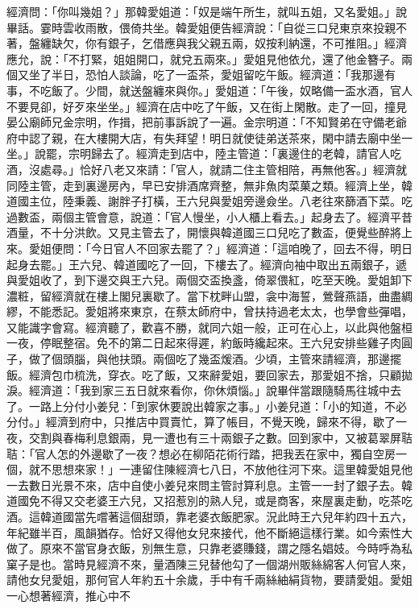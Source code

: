 經濟問：「你叫幾姐？」那韓愛姐道：「奴是端午所生，就叫五姐，又名愛姐。」說畢話。霎時雲收雨散，偎倚共坐。韓愛姐便告經濟說：「自從三口兒東京來投親不著，盤纏缺欠，你有銀子，乞借應與我父親五兩，奴按利納還，不可推阻。」經濟應允，說：「不打緊，姐姐開口，就兌五兩來。」愛姐見他依允，還了他金簪子。兩個又坐了半日，恐怕人談論，吃了一盃茶，愛姐留吃午飯。經濟道：「我那邊有事，不吃飯了。少間，就送盤纏來與你。」愛姐道：「午後，奴略備一盃水酒，官人不要見卻，好歹來坐坐。」經濟在店中吃了午飯，又在街上閑散。走了一回，撞見晏公廟師兄金宗明，作揖，把前事訴說了一遍。金宗明道：「不知賢弟在守備老爺府中認了親，在大樓開大店，有失拜望！明日就使徒弟送茶來，閑中請去廟中坐一坐。」說罷，宗明歸去了。經濟走到店中，陸主管道：「裏邊住的老韓，請官人吃酒，沒處尋。」恰好八老又來請：「官人，就請二住主管相陪，再無他客。」經濟就同陸主管，走到裏邊房內，早已安排酒席齊整，無非魚肉菜菓之類。經濟上坐，韓道國主位，陸秉義、謝胖子打橫，王六兒與愛姐旁邊僉坐。八老往來篩酒下菜。吃過數盃，兩個主管會意，說道：「官人慢坐，小人櫃上看去。」起身去了。經濟平昔酒量，不十分洪飲。又見主管去了，開懷與韓道國三口兒吃了數盃，便覺些醉將上來。愛姐便問：「今日官人不回家去罷了？」經濟道：「這咱晚了，回去不得，明日起身去罷。」王六兒、韓道國吃了一回，下樓去了。經濟向袖中取出五兩銀子，遞與愛姐收了，到下邊交與王六兒。兩個交盃換盞，倚翠偎紅，吃至天晚。愛姐卸下濃粧，留經濟就在樓上閣兒裏歇了。當下枕畔山盟，衾中海誓，鶯聲燕語，曲盡綢繆，不能悉記。愛姐將來東京，在蔡太師府中，曾扶持過老太太，也學會些彈唱，又能識字會寫。經濟聽了，歡喜不勝，就同六姐一般，正可在心上，以此與他盤桓一夜，停眠整宿。免不的第二日起來得遲，約飯時纔起來。王六兒安排些雞子肉圓子，做了個頭腦，與他扶頭。兩個吃了幾盃煖酒。少頃，主管來請經濟，那邊擺飯。經濟包巾梳洗，穿衣。吃了飯，又來辭愛姐，要回家去，那愛姐不捨，只顧拋淚。經濟道：「我到家三五日就來看你，你休煩惱。」說畢伴當跟隨騎馬往城中去了。一路上分付小姜兒：「到家休要說出韓家之事。」小姜兒道：「小的知道，不必分付。」經濟到府中，只推店中買賣忙，算了帳目，不覺天晚，歸來不得，歇了一夜，交割與春梅利息銀兩，見一遭也有三十兩銀子之數。回到家中，又被葛翠屏聐聐：「官人怎的外邊歇了一夜？想必在柳陌花術行踏，把我丟在家中，獨自空房一個，就不思想來家！」一連留住陳經濟七八日，不放他往河下來。這里韓愛姐見他一去數日光景不來，店中自使小姜兒來問主管討算利息。主管一一封了銀子去。韓道國免不得又交老婆王六兒，又招惹別的熟人兒，或是商客，來屋裏走動，吃茶吃酒。這韓道國當先嚐著這個甜頭，靠老婆衣飯肥家。況此時王六兒年約四十五六，年紀雖半百，風韻猶存。恰好又得他女兒來接代，他不斷絕這樣行業。如今索性大做了。原來不當官身衣飯，別無生意，只靠老婆賺錢，謂之隱名娼妓。今時呼為私窠子是也。當時見經濟不來，量酒陳三兒替他勾了一個湖州販絲綿客人何官人來，請他女兒愛姐，那何官人年約五十余歲，手中有千兩絲紬絹貨物，要請愛姐。愛姐一心想著經濟，推心中不